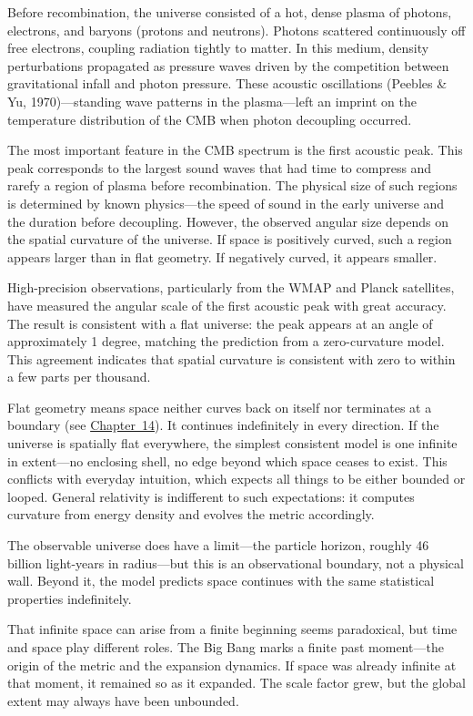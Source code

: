 Before recombination, the universe consisted of a hot, dense plasma of photons, electrons, and baryons (protons and neutrons). Photons scattered continuously off free electrons, coupling radiation tightly to matter. In this medium, density perturbations propagated as pressure waves driven by the competition between gravitational infall and photon pressure. These acoustic oscillations (Peebles \& Yu, 1970)—standing wave patterns in the plasma—left an imprint on the temperature distribution of the CMB when photon decoupling occurred.

The most important feature in the CMB spectrum is the first acoustic peak. This peak corresponds to the largest sound waves that had time to compress and rarefy a region of plasma before recombination. The physical size of such regions is determined by known physics—the speed of sound in the early universe and the duration before decoupling. However, the observed angular size depends on the spatial curvature of the universe. If space is positively curved, such a region appears larger than in flat geometry. If negatively curved, it appears smaller.

High-precision observations, particularly from the WMAP and Planck satellites, have measured the angular scale of the first acoustic peak with great accuracy. The result is consistent with a flat universe: the peak appears at an angle of approximately 1 degree, matching the prediction from a zero-curvature model. This agreement indicates that spatial curvature is consistent with zero to within a few parts per thousand.

Flat geometry means space neither curves back on itself nor terminates at a boundary (see \hyperref[ch:compacttwinparadox]{Chapter~14}). It continues indefinitely in every direction. If the universe is spatially flat everywhere, the simplest consistent model is one infinite in extent—no enclosing shell, no edge beyond which space ceases to exist. This conflicts with everyday intuition, which expects all things to be either bounded or looped. General relativity is indifferent to such expectations: it computes curvature from energy density and evolves the metric accordingly.

The observable universe does have a limit—the particle horizon, roughly 46 billion light-years in radius—but this is an observational boundary, not a physical wall. Beyond it, the model predicts space continues with the same statistical properties indefinitely.

That infinite space can arise from a finite beginning seems paradoxical, but time and space play different roles. The Big Bang marks a finite past moment—the origin of the metric and the expansion dynamics. If space was already infinite at that moment, it remained so as it expanded. The scale factor grew, but the global extent may always have been unbounded.

